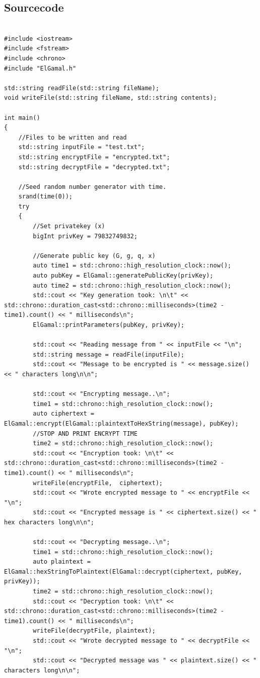 \documentclass{article}
\begin{document}
\subsection{Sourcecode}
\begin{lstlisting}

#include <iostream>
#include <fstream>
#include <chrono>
#include "ElGamal.h"

std::string readFile(std::string fileName);
void writeFile(std::string fileName, std::string contents);

int main()
{
	//Files to be written and read
	std::string inputFile = "test.txt";
	std::string encryptFile = "encrypted.txt";
	std::string decryptFile = "decrypted.txt";

	//Seed random number generator with time.
	srand(time(0));
	try
	{
		//Set privatekey (x)
		bigInt privKey = 79832749832;

		//Generate public key (G, g, q, x)
		auto time1 = std::chrono::high_resolution_clock::now();
		auto pubKey = ElGamal::generatePublicKey(privKey);
		auto time2 = std::chrono::high_resolution_clock::now();
		std::cout << "Key generation took: \n\t" << std::chrono::duration_cast<std::chrono::milliseconds>(time2 - time1).count() << " milliseconds\n";
		ElGamal::printParameters(pubKey, privKey);

		std::cout << "Reading message from " << inputFile << "\n";
		std::string message = readFile(inputFile);
		std::cout << "Message to be encrypted is " << message.size() << " characters long\n\n";

		std::cout << "Encrypting message..\n";
		time1 = std::chrono::high_resolution_clock::now();
		auto ciphertext = ElGamal::encrypt(ElGamal::plaintextToHexString(message), pubKey);
		//STOP AND PRINT ENCRYPT TIME
		time2 = std::chrono::high_resolution_clock::now();
		std::cout << "Encryption took: \n\t" << std::chrono::duration_cast<std::chrono::milliseconds>(time2 - time1).count() << " milliseconds\n";
		writeFile(encryptFile,  ciphertext);
		std::cout << "Wrote encrypted message to " << encryptFile << "\n";
		std::cout << "Encrypted message is " << ciphertext.size() << " hex characters long\n\n";

		std::cout << "Decrypting message..\n";
		time1 = std::chrono::high_resolution_clock::now();
		auto plaintext = ElGamal::hexStringToPlaintext(ElGamal::decrypt(ciphertext, pubKey, privKey));
		time2 = std::chrono::high_resolution_clock::now();
		std::cout << "Decryption took: \n\t" << std::chrono::duration_cast<std::chrono::milliseconds>(time2 - time1).count() << " milliseconds\n";
		writeFile(decryptFile, plaintext);
		std::cout << "Wrote decrypted message to " << decryptFile << "\n";
		std::cout << "Decrypted message was " << plaintext.size() << " characters long\n\n";


\end{lstlisting}
\end{document}
